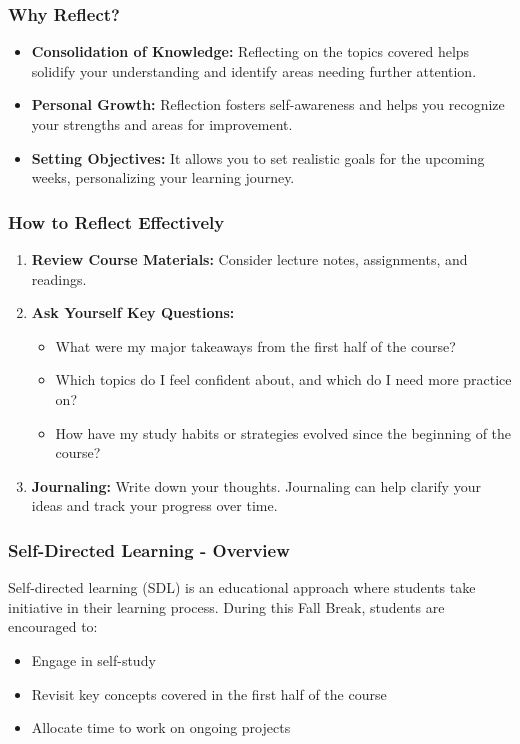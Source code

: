 \documentclass[aspectratio=169]{beamer}
\begin{document}
\begin{frame}[fragile]
    \frametitle{Why Reflect?}
    \begin{itemize}
        \item \textbf{Consolidation of Knowledge:} Reflecting on the topics covered helps solidify your understanding and identify areas needing further attention.
        \item \textbf{Personal Growth:} Reflection fosters self-awareness and helps you recognize your strengths and areas for improvement.
        \item \textbf{Setting Objectives:} It allows you to set realistic goals for the upcoming weeks, personalizing your learning journey.
    \end{itemize}
\end{frame}

\begin{frame}[fragile]
    \frametitle{How to Reflect Effectively}
    \begin{enumerate}
        \item \textbf{Review Course Materials:} Consider lecture notes, assignments, and readings. 
        \item \textbf{Ask Yourself Key Questions:}
        \begin{itemize}
            \item What were my major takeaways from the first half of the course?
            \item Which topics do I feel confident about, and which do I need more practice on?
            \item How have my study habits or strategies evolved since the beginning of the course?
        \end{itemize}
        \item \textbf{Journaling:} Write down your thoughts. Journaling can help clarify your ideas and track your progress over time.
    \end{enumerate}
\end{frame}

\begin{frame}[fragile]
    \frametitle{Self-Directed Learning - Overview}
    Self-directed learning (SDL) is an educational approach where students take initiative in their learning process. 
    During this Fall Break, students are encouraged to:
    \begin{itemize}
        \item Engage in self-study
        \item Revisit key concepts covered in the first half of the course
        \item Allocate time to work on ongoing projects
    \end{itemize}
\end{frame}
\end{document}
